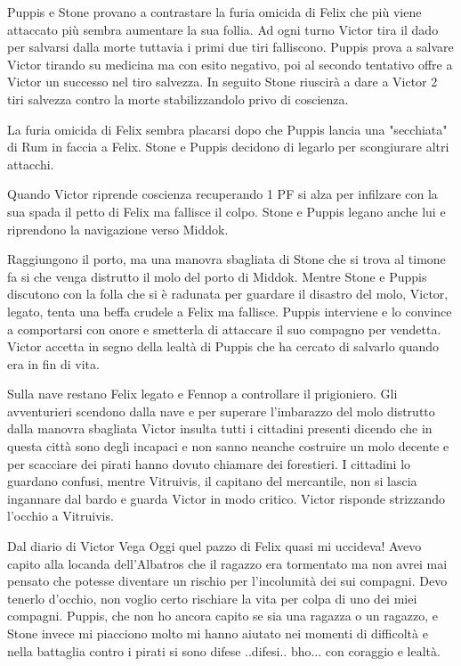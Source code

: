 \documentclass[letterpaper,twocolumn,openany, nodeprecatedcode, nomultitoc]{dndbook}
\begin{document}
Puppis e Stone provano a contrastare la furia omicida di Felix che più viene attaccato più sembra aumentare la sua follia. Ad ogni turno Victor tira il dado per salvarsi dalla morte tuttavia i primi due tiri falliscono. Puppis prova a salvare Victor tirando su medicina ma con esito negativo, poi al secondo tentativo offre a Victor un successo nel tiro salvezza. In seguito Stone riuscirà a dare a Victor 2 tiri salvezza contro la morte stabilizzandolo privo di coscienza.

La furia omicida di Felix sembra placarsi dopo che Puppis lancia una "secchiata" di Rum in faccia a Felix. Stone e Puppis decidono di legarlo per scongiurare altri attacchi.

Quando Victor riprende coscienza recuperando 1 PF si alza per infilzare con la sua spada il petto di Felix ma fallisce il colpo. Stone e Puppis legano anche lui e riprendono la navigazione verso Middok.

Raggiungono il porto, ma una manovra sbagliata di Stone che si trova al timone fa si che venga distrutto il molo del porto di Middok. Mentre Stone e Puppis discutono con la folla che si è radunata per guardare il disastro del molo, Victor, legato, tenta una beffa crudele a Felix ma fallisce. Puppis interviene e lo convince a comportarsi con onore e smetterla di attaccare il suo compagno per vendetta. Victor accetta in segno della lealtà di Puppis che ha cercato di salvarlo quando era in fin di vita.

Sulla nave restano Felix legato e Fennop a controllare il prigioniero. Gli avventurieri scendono dalla nave e per superare l'imbarazzo del molo distrutto dalla manovra sbagliata Victor insulta tutti i cittadini presenti dicendo che in questa città sono degli incapaci e non sanno neanche costruire un molo decente e per scacciare dei pirati hanno dovuto chiamare dei forestieri. I cittadini lo guardano confusi, mentre Vitruivis, il capitano del mercantile, non si lascia ingannare dal bardo e guarda Victor in modo critico. Victor risponde strizzando l'occhio a Vitruivis.

\begin{DndComment}{Dal diario di Victor Vega}
Oggi quel pazzo di Felix quasi mi uccideva! Avevo capito alla locanda dell'Albatros che il ragazzo era tormentato ma non avrei mai pensato che potesse diventare un rischio per l'incolumità dei sui compagni. Devo tenerlo d'occhio, non voglio certo rischiare la vita per colpa di uno dei miei compagni. Puppis, che non ho ancora capito se sia una ragazza o un ragazzo, e Stone invece mi piacciono molto mi hanno aiutato nei momenti di difficoltà e nella battaglia contro i pirati si sono difese ..difesi.. bho... con coraggio e lealtà.
\end{DndComment}
\end{document}
